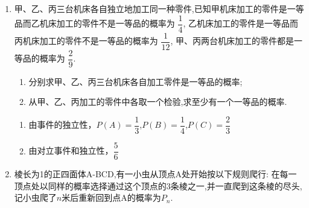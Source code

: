 \begin{enumerate}
    \begin{jieda}
    \end{jieda}
        
    \item 甲、乙、丙三台机床各自独立地加工同一种零件,已知甲机床加工的零件是一等品而乙机床加工的零件不是一等品的概率为 $\dfrac{1}{4}$, 乙机床加工的零件是一等品而丙机床加工的零件不是一等品的概率为 $\dfrac{1}{12}$, 甲、丙两台机床加工的零件都是一等品的概率为 $\dfrac{2}{9}$.
    \begin{enumerate}
    \item 分别求甲、乙、丙三台机床各自加工零件是一等品的概率;
    \item 从甲、乙、丙加工的零件中各取一个检验,求至少有一个一等品的概率.
    \end{enumerate}
    \begin{jieda}
        \begin{enumerate}
            \item 由事件的独立性，$P(A)=\dfrac{1}{3}$,$P(B)=\dfrac{1}{4}$,$P(C)=\dfrac{2}{3}$
            \item 由对立事件和独立性，$\dfrac{5}{6}$
        \end{enumerate}
    \end{jieda}

    
    \item 棱长为1的正四面体A-BCD,有一小虫从顶点A处开始按以下规则爬行: 在每一顶点处以同样的概率选择通过这个顶点的3条棱之一,并一直爬到这条棱的尽头,记小虫爬了$n$米后重新回到点A的概率为$P_n$.
    
    \begin{jieda}
    \end{jieda}


\end{enumerate}

